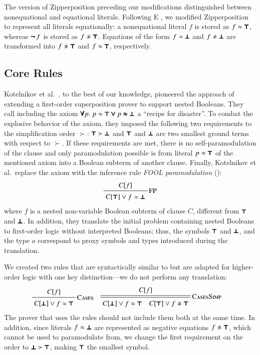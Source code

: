The version of Zipperposition preceding our modifications distinguished between non\-equational
and equational literals. Following E \cite{scv-19-e23}, we
modified Zipperposition to represent all literals equationally: a nonequational
literal $f$ is stored as $f \approx \pmb{\top}$, whereas $\pmb{\neg\,} f$ is stored as $f
\noteq \itrue$. Equations of the form $f \approx \pmb{\bot} $ and $f \noteq \ifalse$ are
transformed into $f \noteq \itrue$ and $f \approx \pmb{\top}$, respectively.

\subsection{Core Rules}
\label{subsect:bool:core}

Kotelnikov et al.\ \cite{kotelnikov-15-fool}, to the best of our
knowledge, pioneered the approach of extending a first-order superposition prover to support
nested Booleans. They call including the axiom $\pmb{\forall}
p. \; p \approx \pmb{\top} \pmb{\lor} p \pmb{\approx} \pmb{\bot}$ a  ``recipe for disaster''. To combat the
explosive behavior of the axiom, they imposed the following two requirements to
the simplification order $\succ$: $\pmb{\top} \succ \pmb{\bot}$ and
$\pmb{\top}$ and $\pmb{\bot}$ are two smallest ground terms with respect to $\succ$. If
these requirements are met, there is no self-paramodulation of the clause
and only paramodulation possible is from literal $p \approx \pmb{\top}$ of the mentioned axiom
into a Boolean subterm of another clause. Finally, Kotelnikov et al.\ replace
the axiom with the inference rule \emph{FOOL paramodulation} ():
\pagebreak[2]
%
$$ \namedinference{FP}{C[f]}{C[\itrue] \vee f \eq \ifalse} $$
%
where $f$ is a nested non-variable Boolean subterm of clause $C$, different from
$\pmb{\top}$ and $\pmb{\bot}$. In addition, they translate the initial problem containing nested
Booleans  to first-order logic without interpreted Booleans; thus, the symbols $\pmb{\top}$ and $\pmb{\bot}$, and the type $o$
correspond to proxy symbols and types introduced during the translation. 

We created two rules that are syntactically similar to  but
are adapted for higher-order logic with one key distinction---we do not perform any translation:
%
\begin{align*}
  & \namedinference{Cases}{C[f]}{C[\ifalse] \vee f \eq \itrue}
  && \namedsimp{CasesSimp}{C[f]}{C[\ifalse] \vee f \eq \itrue \quad C[\itrue] \vee f \noteq \itrue}
\end{align*}
%
The prover that uses the rules should not include them both at the same time.
In addition, since
literals $f \approx \pmb{\bot}$ are represented as negative equations $f \noteq \itrue$, which cannot be used to paramodulate from,
we change the first requirement on the order to $\pmb{\bot} \succ
\pmb{\top}$, making $\pmb{\top}$ the smallest symbol.

